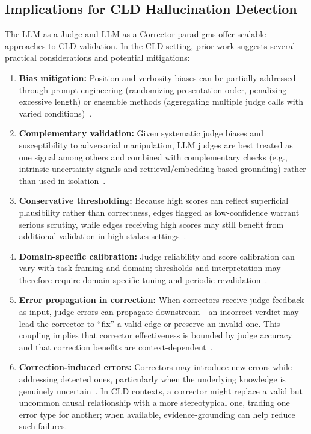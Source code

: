 \subsection{Implications for CLD Hallucination Detection}

The LLM-as-a-Judge and LLM-as-a-Corrector paradigms offer scalable approaches to CLD validation. In the CLD setting, prior work suggests several practical considerations and potential mitigations:

\begin{enumerate}
    \item \textbf{Bias mitigation:} Position and verbosity biases can be partially addressed through prompt engineering (randomizing presentation order, penalizing excessive length) or ensemble methods (aggregating multiple judge calls with varied conditions)~\citep{zheng2024judging, li2024llmsjudges}.
    
    \item \textbf{Complementary validation:} Given systematic judge biases and susceptibility to adversarial manipulation, LLM judges are best treated as one signal among others and combined with complementary checks (e.g., intrinsic uncertainty signals and retrieval/embedding-based grounding) rather than used in isolation~\citep{shi2024optimization, li2024llmsjudges}.
    
    \item \textbf{Conservative thresholding:} Because high scores can reflect superficial plausibility rather than correctness, edges flagged as low-confidence warrant serious scrutiny, while edges receiving high scores may still benefit from additional validation in high-stakes settings~\citep{li2024llmsjudges}.
    
    \item \textbf{Domain-specific calibration:} Judge reliability and score calibration can vary with task framing and domain; thresholds and interpretation may therefore require domain-specific tuning and periodic revalidation~\citep{li2024llmsjudges}.
    
    \item \textbf{Error propagation in correction:} When correctors receive judge feedback as input, judge errors can propagate downstream---an incorrect verdict may lead the corrector to ``fix'' a valid edge or preserve an invalid one. This coupling implies that corrector effectiveness is bounded by judge accuracy and that correction benefits are context-dependent~\citep{dhuliawala2024chain, shinn2024reflexion, madaan2023selfrefineiterativerefinementselffeedback}.
    
    \item \textbf{Correction-induced errors:} Correctors may introduce new errors while addressing detected ones, particularly when the underlying knowledge is genuinely uncertain~\citep{dhuliawala2024chain, shinn2024reflexion}. In CLD contexts, a corrector might replace a valid but uncommon causal relationship with a more stereotypical one, trading one error type for another; when available, evidence-grounding can help reduce such failures.
\end{enumerate}

